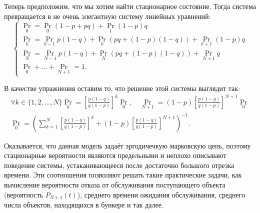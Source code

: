Теперь предположим, что мы хотим найти стационарное состояние. Тогда система 
превращается в не очень элегантную систему линейных уравнений:
\[
	\begin{cases}
	\Pr_{0} = \Pr_{0}(1 - p + pq) + \Pr_{1}(1 - p)q \\
	\Pr_{k} = \Pr_{k - 1}p(1 - q) + \Pr_{k}(pq + (1 - p)(1 - 
	q)) + \Pr_{k + 1}(1 - p)q \\
	\Pr_{N} = \Pr_{N - 1}p(1 - q) + \Pr_{N}(pq + (1 - p)(1 - q)) + \Pr_{N + 1}q 
	\\
	\Pr_{0} + \ldots + \Pr_{N + 1} = 1.
	\end{cases}
\]

В качестве упражнения оставим то, что решение этой системы выглядит так:
\begin{gather}
	\forall k \in \{1, 2, \ldots, N\} \Pr_{k} = \left[\frac{p(1 - q)}{q(1 - 
	p)}\right]^{k}\Pr_{0}, \quad \Pr_{N + 1} = (1 - p)\left[\frac{p(1 - q)}{q(1 
	- p)}\right]^{N + 1}\Pr_{0} \\ 
	\Pr_{0} = \left(\sum_{k = 1}^{N} \left[\frac{p(1 - q)}{q(1 - p)}\right]^{k} 
	+ (1 - p)\left[\frac{p(1 - q)}{q(1 - p)}\right]^{N + 1}\right)^{-1}.
\end{gather}

Оказывается, что данная модель задаёт эргодичечкую марковскую цепь, поэтому 
стационарные вероятности являются предельными и неплохо описывают поведение 
системы, устаканивающееся после достаточно большого отрезка времени. Эти 
соотношения позволяют решать такие практические задачи, как вычисление 
вероятности отказа от обслуживания поступающего объекта (вероятность \(P_{N + 
1}(t)\)), среднего времени ожидания обслуживания, среднего числа объектов, 
находящихся в бункере и так далее.